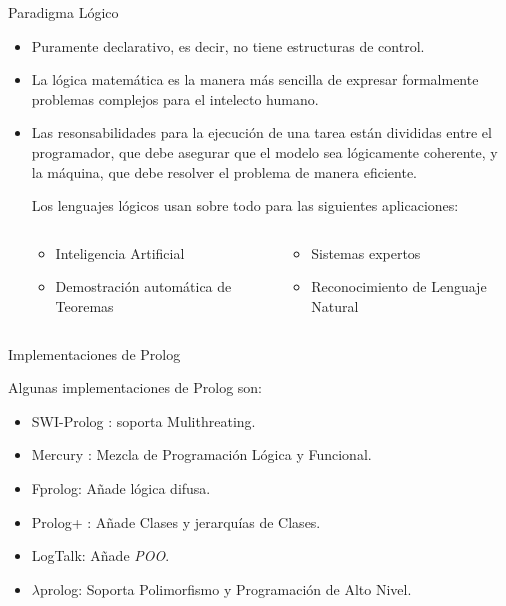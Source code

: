 \documentclass[xcolor=dvipsnames]{beamer}
\begin{document}
\begin{frame}{Paradigma Lógico}

\begin{itemize}
\item Puramente declarativo, es decir, no tiene estructuras de control.
\item La lógica matemática es la manera más sencilla de expresar formalmente problemas complejos para el intelecto humano.
\item Las resonsabilidades para la ejecución de una tarea están divididas entre el programador, que debe asegurar que el modelo sea lógicamente coherente, y la máquina, que debe resolver el problema de manera eficiente.


Los lenguajes lógicos usan sobre todo para las siguientes aplicaciones:

\begin{columns}
  \begin{column}{0.45\textwidth}
  \begin{itemize}
    \item Inteligencia Artificial
    \item Demostración automática de Teoremas
  \end{itemize}
  \end{column}

  \begin{column}{0.45\textwidth}
  \begin{itemize}
    \item Sistemas expertos
    \item Reconocimiento de Lenguaje Natural
  \end{itemize}
  \end{column}
\end{columns}

\end{itemize}

\end{frame}

\begin{frame}{Implementaciones de Prolog}

    Algunas implementaciones de Prolog son:

    \begin{itemize}
    \item SWI-Prolog : soporta Mulithreating.
    \item Mercury : Mezcla de Programación Lógica y Funcional.
    \item Fprolog: Añade lógica difusa.
    \item Prolog+ : Añade Clases y jerarquías de Clases.
    \item LogTalk: Añade \textit{POO}.
    \item $\lambda$prolog: Soporta Polimorfismo y Programación de Alto Nivel.
    \end{itemize}

\end{frame}
\end{document}
